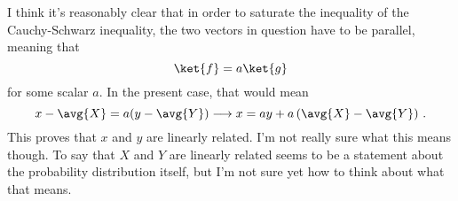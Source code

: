 I think it's reasonably clear that in order to saturate the inequality of the Cauchy-Schwarz inequality, the two vectors in question have to be parallel, meaning that
\begin{equation*}
\ket{f} = a \ket{g}
\end{equation*}
for some scalar $a$.
In the present case, that would mean
\begin{equation*}
x - \avg{X} = a (y - \avg{Y}) \longrightarrow x = ay + a \left( \avg{X} - \avg{Y} \right) \, .
\end{equation*}
This proves that $x$ and $y$ are linearly related.
I'm not really sure what this means though.
To say that $X$ and $Y$ are linearly related seems to be a statement about the probability distribution itself, but I'm not sure yet how to think about what that means.
